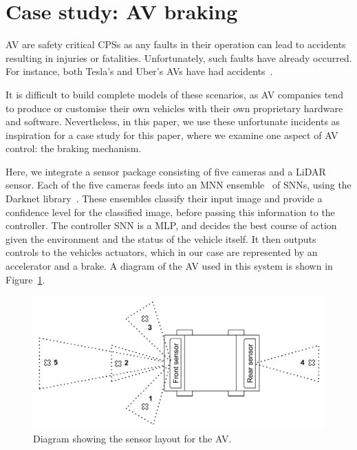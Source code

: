\section{Case study: \acf{AV} braking}
\label{sec:case}

\ac{AV} are safety critical \acfp{CPS} as any faults in their operation can lead to accidents resulting in injuries or fatalities. 
Unfortunately, such faults have already occurred.
For instance, both Tesla's and Uber's \acp{AV} have had accidents~\cite{stewart_2018,coldewey_2018}.

It is difficult to build complete models of these scenarios, as \ac{AV} companies tend to produce or customise their own vehicles with their own proprietary hardware and software.
Nevertheless, in this paper, we use these unfortunate incidents as inspiration for a case study for this paper, where we examine one aspect of \ac{AV} control: the braking mechanism.
 
Here, we integrate a sensor package consisting of five cameras and a \ac{LiDAR} sensor. 
Each of the five cameras feeds into an \acf{MNN} ensemble~\cite{Maqsood2004} of \acp{SNN}, using the Darknet library~\cite{darknet13}.
These ensembles classify their input image and provide a confidence level for the classified image, before passing this information to the controller.
The controller \ac{SNN} is a \ac{MLP}, and decides the best course of action given the environment and the status of the vehicle itself. 
It then outputs controls to the vehicles actuators, which in our case are represented by an accelerator and a brake.
A diagram of the \ac{AV} used in this system is shown in Figure~\ref{fig:av}. 

\begin{figure}[H]
	\centering
	\includegraphics[width=\textwidth]{Content/fig/AV.pdf}
	\caption{Diagram showing the sensor layout for the \ac{AV}. \label{fig:av}}
\end{figure}


